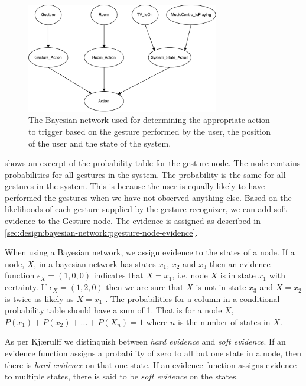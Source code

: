 \begin{figure}[h!]
\centering
\includegraphics[width=0.75\textwidth]{images/bayesian-network}
\caption{The Bayesian network used for determining the appropriate action to trigger based on the gesture performed by the user, the position of the user and the state of the system.}
\label{fig:design:bayesian-network:overview}
\end{figure}

 shows an excerpt of the probability table for the gesture node. The node contains probabilities for all gestures in the system. The probability is the same for all gestures in the system. This is because the user is equally likely to have performed the gestures when we have not observed anything else. Based on the likelihoods of each gesture supplied by the gesture recognizer, we can add soft evidence to the Gesture node. The evidence is assigned as described in \cref{sec:design:bayesian-network:pgesture-node-evidence}.

When using a Bayesian network, we assign evidence to the states of a node. If a node, $X$, in a bayesian network has states $x_1$, $x_2$ and $x_3$ then an evidence function $\epsilon_X = (1, 0, 0)$ indicates that $X = x_1$, i.e. node $X$ is in state $x_1$ with certainty. If $\epsilon_X = (1, 2, 0)$ then we are sure that $X$ is not in state $x_3$ and $X = x_2$ is twice as likely as $X = x_1$ \cite[pp. 23-24]{kjaerulff2008bayesian}. The probabilities for a column in a conditional probability table should have a sum of 1. That is for a node $X$, $P(x_1) + P(x_2) + ... + P(X_n) = 1$ where $n$ is the number of states in $X$.

As per Kjærulff \etal\cite[pp. 23-24]{kjaerulff2008bayesian} we distinquish between \emph{hard evidence} and \emph{soft evidence}. If an evidence function assigns a probability of zero to all but one state in a node, then there is \emph{hard evidence} on that one state. If an evidence function assigns evidence to multiple states, there is said to be \emph{soft evidence} on the states.

